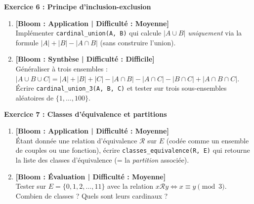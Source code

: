 \documentclass[12pt,a4paper]{report}
\begin{document}
\vspace{0.3cm}

\noindent\textbf{Exercice 6 : Principe d'inclusion-exclusion}
\begin{enumerate}
    \item \textbf{[Bloom : Application | Difficulté : Moyenne]} \\
    Implémenter \texttt{cardinal\_union(A, B)} qui calcule $|A \cup B|$ \emph{uniquement} via la formule $|A| + |B| - |A \cap B|$ (sans construire l'union).
    \item \textbf{[Bloom : Synthèse | Difficulté : Difficile]} \\
    Généraliser à trois ensembles : $|A \cup B \cup C| = |A| + |B| + |C| - |A \cap B| - |A \cap C| - |B \cap C| + |A \cap B \cap C|$. Écrire \texttt{cardinal\_union\_3(A, B, C)} et tester sur trois sous-ensembles aléatoires de $\{1, \dots, 100\}$.
\end{enumerate}

\vspace{0.3cm}

\noindent\textbf{Exercice 7 : Classes d'équivalence et partitions}
\begin{enumerate}
    \item \textbf{[Bloom : Application | Difficulté : Moyenne]} \\
    Étant donnée une relation d'équivalence $\mathcal{R}$ sur $E$ (codée comme un ensemble de couples ou une fonction), écrire \texttt{classes\_equivalence(R, E)} qui retourne la liste des classes d'équivalence (= la \emph{partition} associée).
    \item \textbf{[Bloom : Évaluation | Difficulté : Moyenne]} \\
    Tester sur $E = \{0, 1, 2, \dots, 11\}$ avec la relation $x \mathcal{R} y \iff x \equiv y \pmod{3}$. Combien de classes ? Quels sont leurs cardinaux ?
\end{enumerate}

\vspace{0.3cm}
\end{document}

